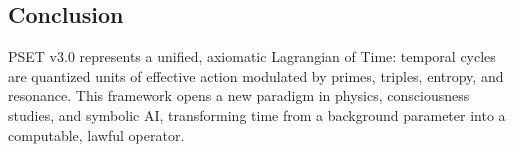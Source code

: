 \documentclass[12]{amsart}
\theoremstyle{plain}
\begin{document}
\subsection{Conclusion}
PSET v3.0 represents a unified, axiomatic Lagrangian of Time: temporal cycles are quantized units of effective action modulated by primes, triples, entropy, and resonance. This framework opens a new paradigm in physics, consciousness studies, and symbolic AI, transforming time from a background parameter into a computable, lawful operator.



\nocite{*}


\clearpage
\end{document}
